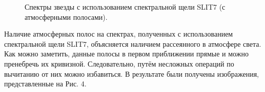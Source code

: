 \documentclass[a4paper]{article}
\begin{document}
\begin{figure}[h]
\begin{minipage}[h]{0.50\linewidth}
\end{minipage}
\caption{Спектры звезды с использованием спектральной щели SLIT7 (с атмосферными полосами).}
\label{ris:image2}
\end{figure}

Наличие атмосферных полос на спектрах, полученных с использованием спектральной щели SLIT7, объясняется наличием рассеянного в атмосфере света. Как можно заметить, данные полосы в первом приближении прямые и можно пренебречь их кривизной. Следовательно, путём несложных операций по вычитанию от них можно избавиться. В результате были получены изображения, представленные на Рис. 4.

\begin{figure}[h]
\begin{minipage}[h]{0.50\linewidth}
\end{minipage}
\begin{minipage}[h]{0.50\linewidth}
\end{minipage}
\begin{minipage}[h]{0.50\linewidth}

\end{minipage}
\end{figure}
\end{document}
